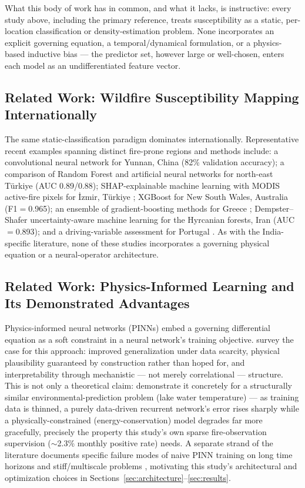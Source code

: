 \documentclass[journal]{IEEEtran}
\begin{document}
What this body of work has in common, and what it lacks, is instructive: every study above, including the primary reference, treats susceptibility as a static, per-location classification or density-estimation problem. None incorporates an explicit governing equation, a temporal/dynamical formulation, or a physics-based inductive bias --- the predictor set, however large or well-chosen, enters each model as an undifferentiated feature vector.

\subsection{Related Work: Wildfire Susceptibility Mapping Internationally}

The same static-classification paradigm dominates internationally. Representative recent examples spanning distinct fire-prone regions and methods include: a convolutional neural network for Yunnan, China \cite{zhang2019} (82\% validation accuracy); a comparison of Random Forest and artificial neural networks for north-east T\"{u}rkiye \cite{kantarcioglu2023} (AUC 0.89/0.88); SHAP-explainable machine learning with MODIS active-fire pixels for \.{I}zmir, T\"{u}rkiye \cite{iban2024}; XGBoost for New South Wales, Australia \cite{zakari2025} (F1$=$0.965); an ensemble of gradient-boosting methods for Greece \cite{symeonidis2025}; Dempster--Shafer uncertainty-aware machine learning for the Hyrcanian forests, Iran \cite{gholamnia2026} (AUC$=$0.893); and a driving-variable assessment for Portugal \cite{santananeto2025}. As with the India-specific literature, none of these studies incorporates a governing physical equation or a neural-operator architecture.

\subsection{Related Work: Physics-Informed Learning and Its Demonstrated Advantages}

Physics-informed neural networks (PINNs) \cite{raissi2019} embed a governing differential equation as a soft constraint in a neural network's training objective. \cite{karniadakis2021} survey the case for this approach: improved generalization under data scarcity, physical plausibility guaranteed by construction rather than hoped for, and interpretability through mechanistic --- not merely correlational --- structure. This is not only a theoretical claim: \cite{read2019} demonstrate it concretely for a structurally similar environmental-prediction problem (lake water temperature) --- as training data is thinned, a purely data-driven recurrent network's error rises sharply while a physically-constrained (energy-conservation) model degrades far more gracefully, precisely the property this study's own sparse fire-observation supervision ($\sim$2.3\% monthly positive rate) needs. A separate strand of the literature documents specific failure modes of naive PINN training on long time horizons and stiff/multiscale problems \cite{krishnapriyan2021,wang2021gradient}, motivating this study's architectural and optimization choices in Sections~\ref{sec:architecture}--\ref{sec:results}.
\end{document}
